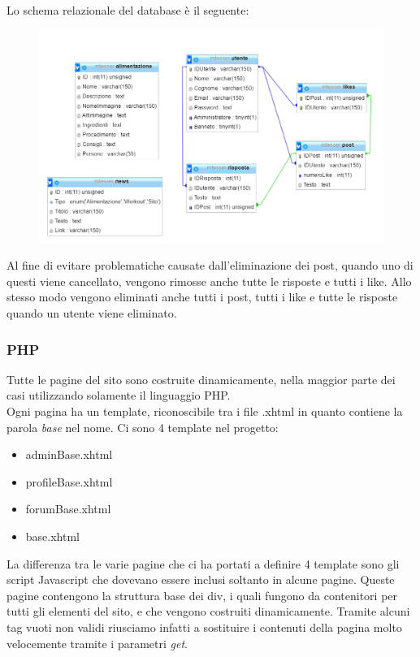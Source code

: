Lo schema relazionale del database è il seguente: 

\begin{figure}
	\centering
	\includegraphics[width=18cm]{img/database.png}
\end{figure}
\newpage
Al fine di evitare problematiche causate dall'eliminazione dei post, quando uno di questi viene cancellato, vengono rimosse anche tutte le risposte e tutti i like. Allo stesso modo vengono eliminati anche tutti i post, 
tutti i like e tutte le risposte quando un utente viene eliminato.

\subsubsection{PHP}\label{subs:php}

Tutte le pagine del sito sono costruite dinamicamente, nella maggior parte dei casi utilizzando solamente il linguaggio PHP.\\
Ogni pagina ha un template, riconoscibile tra i file .xhtml in quanto contiene la parola \textit{base} nel nome. Ci sono 4 template nel progetto:

\begin{itemize}
    
	\item adminBase.xhtml
    \item profileBase.xhtml
	\item forumBase.xhtml
	\item base.xhtml
	
\end{itemize}

La differenza tra le varie pagine che ci ha portati a definire 4 template sono gli script Javascript che dovevano essere inclusi soltanto in alcune pagine. Queste pagine contengono la struttura base dei div, 
i quali fungono da contenitori per tutti gli elementi del sito, e che vengono costruiti dinamicamente. Tramite alcuni tag vuoti non validi riusciamo infatti a sostituire i contenuti della pagina molto velocemente tramite i parametri \textit{get}.\\

